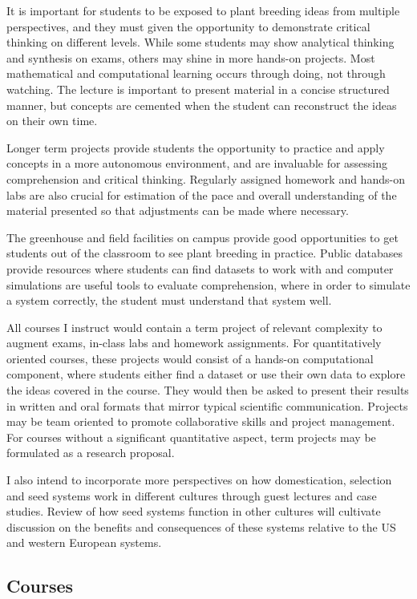 \documentclass[11pt]{article}
\begin{document}
It is important for students to be exposed to plant breeding ideas from multiple perspectives, and they must given the opportunity to demonstrate critical thinking on different levels. While some students may show analytical thinking and synthesis on exams, others may shine in more hands-on projects. Most mathematical and computational learning occurs through doing, not through watching. The lecture is important to present material in a concise structured manner, but concepts are cemented when the student can reconstruct the ideas on their own time.


Longer term projects provide students the opportunity to practice and apply concepts in a more autonomous environment, and are invaluable for assessing comprehension and critical thinking. Regularly assigned homework and hands-on labs are also crucial for estimation of the pace and overall understanding of the material presented so that adjustments can be made where necessary. 

The greenhouse and field facilities on campus provide good opportunities to get students out of the classroom to see plant breeding in practice. Public databases provide resources where students can find datasets to work with and computer simulations are useful tools to evaluate comprehension, where in order to simulate a system correctly, the student must understand that system well.


All courses I instruct would contain a term project of relevant complexity to augment exams, in-class labs and homework assignments. For quantitatively oriented courses, these projects would consist of a hands-on computational component, where students either find a dataset or use their own data to explore the ideas covered in the course. They would then be asked to present their results in written and oral formats that mirror typical scientific communication. Projects may be team oriented to promote collaborative skills and project management. For courses without a significant quantitative aspect, term projects may be formulated as a research proposal.

I also intend to incorporate more perspectives on how domestication, selection and seed systems work in different cultures through guest lectures and case studies. Review of how seed systems function in other cultures will cultivate discussion on the benefits and consequences of these systems relative to the US and western European systems. 

\subsection*{Courses}
\end{document}
